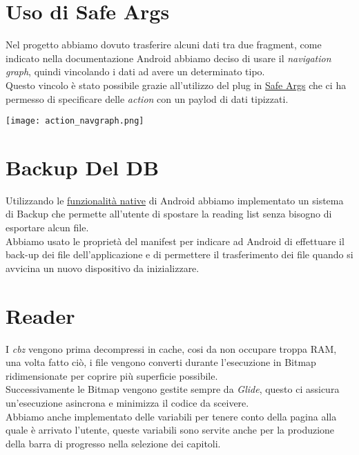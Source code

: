 \documentclass[../Assignment-3-LPSMT.tex]{subfiles}
\begin{document}


\section{Uso di Safe Args}

Nel progetto abbiamo dovuto trasferire alcuni dati tra due fragment, come indicato nella documentazione Android abbiamo deciso di usare il \emph{navigation graph}, quindi vincolando i dati ad avere un determinato tipo.\\
Questo vincolo è stato possibile grazie all'utilizzo del plug in \href{https://developer.android.com/guide/navigation/use-graph/pass-data#Safe-args}{Safe Args} che ci ha permesso di specificare delle \emph{action} con un paylod di dati tipizzati.\\

\begin{center}
  \texttt{[image: action\_navgraph.png]}
\end{center}

\section{Backup Del DB}

Utilizzando le \href{https://developer.android.com/guide/topics/data/autobackup}{funzionalità native} di Android abbiamo implementato un sistema di Backup che permette all'utente di spostare la reading list senza bisogno di esportare alcun file.\\
Abbiamo usato le proprietà del manifest per indicare ad Android di effettuare il back-up dei file dell'applicazione e di permettere il trasferimento dei file quando si avvicina un nuovo dispositivo da inizializzare.

\section{Reader}

I \emph{cbz} vengono prima decompressi in cache, cosi da non occupare troppa RAM, una volta fatto ciò, i file vengono converti durante l'esecuzione in Bitmap ridimensionate per coprire più superficie possibile.\\
Successivamente le Bitmap vengono gestite sempre da \emph{Glide}, questo ci assicura un'esecuzione asincrona e minimizza il codice da sceivere.\\
Abbiamo anche implementato delle variabili per tenere conto della pagina alla quale è arrivato l'utente, queste variabili sono servite anche per la produzione della barra di progresso nella selezione dei capitoli.
\end{document}

